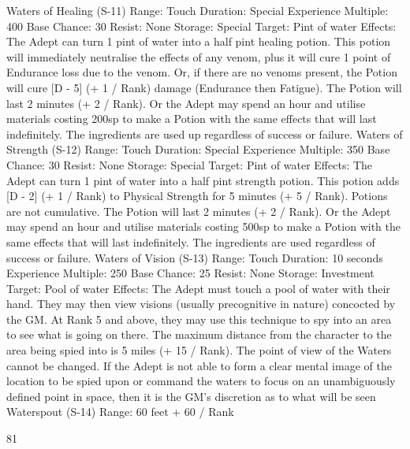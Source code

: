 \documentclass[a4paper]{article}
\begin{document}
\begin{multicols}{3}
Waters of Healing (S-11)
Range: Touch
Duration: Special
Experience Multiple: 400
Base Chance: 30%
Resist: None
Storage: Special
Target: Pint of water
Effects: The Adept can turn 1 pint of water into a
half pint healing potion. This potion will immediately neutralise the effects of any venom, plus it
will cure 1 point of Endurance loss due to the
venom. Or, if there are no venoms present, the
Potion will cure [D - 5] (+ 1 / Rank) damage (Endurance then Fatigue). The Potion will last 2 minutes (+ 2 / Rank). Or the Adept may spend an hour
and utilise materials costing 200sp to make a Potion with the same effects that will last indefinitely.
The ingredients are used up regardless of success
or failure.
Waters of Strength (S-12)
Range: Touch
Duration: Special
Experience Multiple: 350
Base Chance: 30%
Resist: None
Storage: Special
Target: Pint of water
Effects: The Adept can turn 1 pint of water into a
half pint strength potion. This potion adds [D - 2]
(+ 1 / Rank) to Physical Strength for 5 minutes (+ 5
/ Rank). Potions are not cumulative. The Potion
will last 2 minutes (+ 2 / Rank). Or the Adept may
spend an hour and utilise materials costing 500sp
to make a Potion with the same effects that will last
indefinitely. The ingredients are used regardless of
success or failure.
Waters of Vision (S-13)
Range: Touch
Duration: 10 seconds
Experience Multiple: 250
Base Chance: 25%
Resist: None
Storage: Investment
Target: Pool of water
Effects: The Adept must touch a pool of water with
their hand. They may then view visions (usually
precognitive in nature) concocted by the GM. At
Rank 5 and above, they may use this technique to
spy into an area to see what is going on there. The
maximum distance from the character to the area
being spied into is 5 miles (+ 15 / Rank). The point
of view of the Waters cannot be changed. If the
Adept is not able to form a clear mental image of
the location to be spied upon or command the
waters to focus on an unambiguously defined point
in space, then it is the GM’s discretion as to what
will be seen
Waterspout (S-14)
Range: 60 feet + 60 / Rank

81


\end{multicols}
\end{document}
